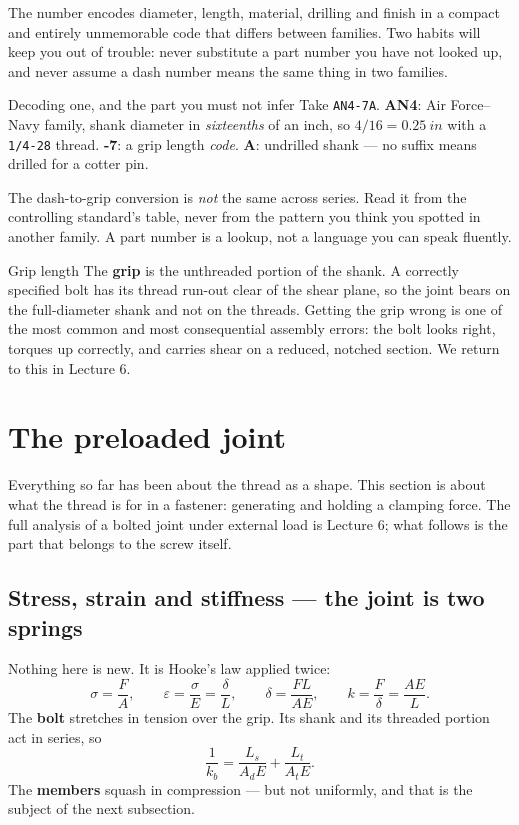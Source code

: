 \documentclass[11pt,a4paper]{article}
\begin{document}
\medskip
The number encodes diameter, length, material, drilling and finish in a compact and entirely
unmemorable code that differs between families. Two habits will keep you out of trouble: never
substitute a part number you have not looked up, and never assume a dash number means the same thing
in two families.

\begin{keybox}{Decoding one, and the part you must not infer}
Take \texttt{AN4-7A}. \textbf{AN4}: Air Force--Navy family, shank diameter in \emph{sixteenths} of an
inch, so $4/16=\SI{0.25}{in}$ with a \texttt{1/4-28} thread. \textbf{-7}: a grip length \emph{code}.
\textbf{A}: undrilled shank --- no suffix means drilled for a cotter pin.

\medskip
The dash-to-grip conversion is \emph{not} the same across series. Read it from the controlling
standard's table, never from the pattern you think you spotted in another family. A part number is a
lookup, not a language you can speak fluently.
\end{keybox}

\begin{aerobox}{Grip length}
The \textbf{grip} is the unthreaded portion of the shank. A correctly specified bolt has its thread
run-out clear of the shear plane, so the joint bears on the full-diameter shank and not on the
threads. Getting the grip wrong is one of the most common and most consequential assembly errors: the
bolt looks right, torques up correctly, and carries shear on a reduced, notched section. We return to
this in Lecture 6.
\end{aerobox}

\section{The preloaded joint}\label{sec:preload}

Everything so far has been about the thread as a shape. This section is about what the thread is for
in a fastener: generating and holding a clamping force. The full analysis of a bolted joint under
external load is Lecture 6; what follows is the part that belongs to the screw itself.

\subsection{Stress, strain and stiffness --- the joint is two springs}

Nothing here is new. It is Hooke's law applied twice:
\[
\sigma=\frac{F}{A},\qquad \varepsilon=\frac{\sigma}{E}=\frac{\delta}{L},
\qquad \delta=\frac{FL}{AE},\qquad k=\frac{F}{\delta}=\frac{AE}{L}.
\]
The \textbf{bolt} stretches in tension over the grip. Its shank and its threaded portion act in
series, so
\[
\frac{1}{k_b}=\frac{L_s}{A_d E}+\frac{L_t}{A_t E}.
\]
The \textbf{members} squash in compression --- but not uniformly, and that is the subject of the next
subsection.
\end{document}
